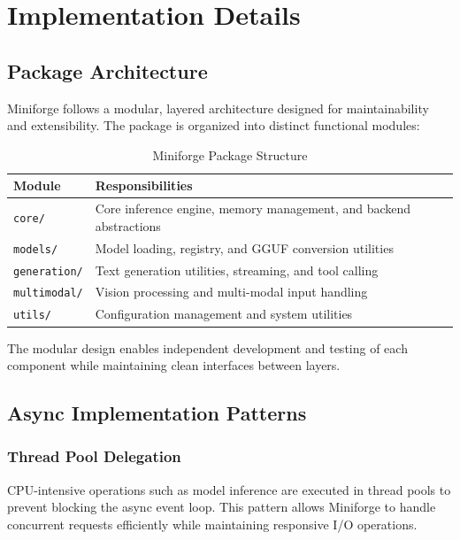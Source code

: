 \section{Implementation Details}
\label{sec:implementation}

\subsection{Package Architecture}

Miniforge follows a modular, layered architecture designed for maintainability and extensibility. The package is organized into distinct functional modules:

\begin{table}[h]
\centering
\caption{Miniforge Package Structure}
\label{tab:package_structure}
\begin{tabular}{lp{8cm}}
\toprule
\textbf{Module} & \textbf{Responsibilities} \\
\midrule
\texttt{core/} & Core inference engine, memory management, and backend abstractions \\
\texttt{models/} & Model loading, registry, and GGUF conversion utilities \\
\texttt{generation/} & Text generation utilities, streaming, and tool calling \\
\texttt{multimodal/} & Vision processing and multi-modal input handling \\
\texttt{utils/} & Configuration management and system utilities \\
\bottomrule
\end{tabular}
\end{table}

The modular design enables independent development and testing of each component while maintaining clean interfaces between layers.

\subsection{Async Implementation Patterns}

\subsubsection{Thread Pool Delegation}

CPU-intensive operations such as model inference are executed in thread pools to prevent blocking the async event loop. This pattern allows Miniforge to handle concurrent requests efficiently while maintaining responsive I/O operations.

